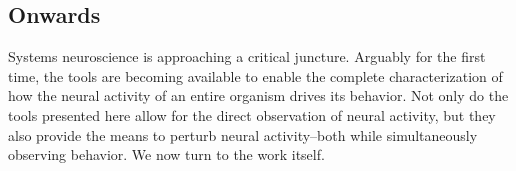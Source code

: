 


\subsection{Onwards}
Systems neuroscience is approaching  a critical juncture. Arguably for the first time, the tools are becoming available to enable the  complete characterization of how the neural activity of an entire organism drives its behavior. Not only  do the tools presented here allow for the direct observation of neural activity, but they also provide the means to perturb neural activity--both while simultaneously observing behavior. We now turn to the work itself.


